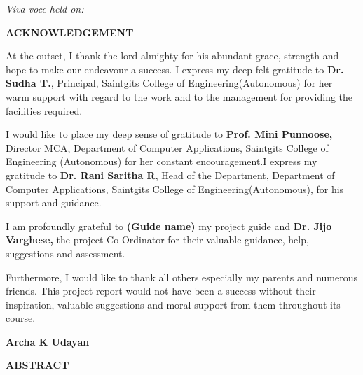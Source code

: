 \documentclass[12pt,a4paper]{report}
\begin{document}
\vspace{1.8cm}


\textit{Viva-voce held on:}
\newpage
\thispagestyle{empty}

\begin{center}
\fontsize{16pt}{18pt}\selectfont
\textbf{ACKNOWLEDGEMENT}
\end{center}

\vspace{1cm}

At the outset, I thank the lord almighty for his abundant grace, strength and hope to make our endeavour a success. I express my deep-felt gratitude to \textbf{Dr. Sudha T.}, Principal, Saintgits College of Engineering(Autonomous) for her warm support with regard to the work and to the management for providing the facilities required.


I would like to place my deep sense of gratitude to \textbf{Prof. Mini Punnoose,} Director MCA, Department of Computer Applications, Saintgits College of Engineering (Autonomous) for her constant encouragement.I express my gratitude to \textbf{Dr. Rani Saritha R}, Head of the Department, Department of Computer Applications, Saintgits College of Engineering(Autonomous), for his support and guidance.


I am profoundly grateful to \textbf{(Guide name)} my project guide   and \textbf{Dr. Jijo Varghese,} the project Co-Ordinator for their valuable guidance, help, suggestions and assessment.


Furthermore, I would like to thank all others especially my parents and numerous friends. This project report would not have been a success without their inspiration, valuable suggestions and moral support from them throughout its course.






\vspace{2cm}

\begin{flushright}
\textbf{Archa K Udayan}
\end{flushright}


\newpage
\thispagestyle{empty}

\begin{center}
\fontsize{16pt}{18pt}\selectfont
\textbf{ABSTRACT}
\end{center}
\end{document}
